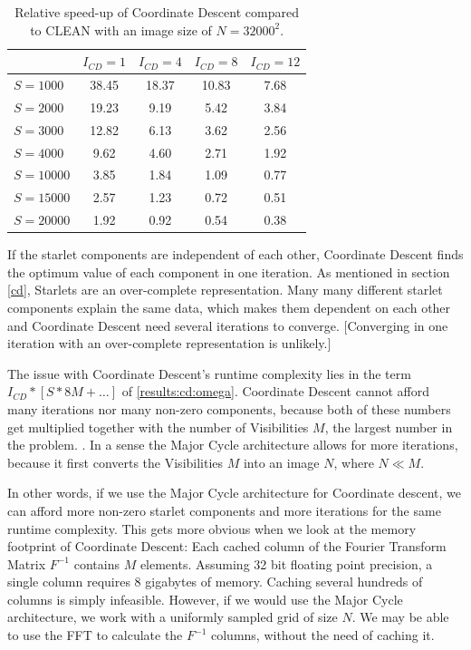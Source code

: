 \begin{table}[h!]
	\begin{center}
		\begin{tabular}{l|c|c|c|c} %
			& $I_{CD} = 1$ & $I_{CD} = 4$ &  $I_{CD} = 8$ &  $I_{CD} = 12$\\
			\hline
			$S=1000$ & 38.45 & 18.37 & 10.83 & 7.68\\
			$S=2000$ & 19.23 & 9.19 & 5.42 & 3.84 \\
			$S=3000$ & 12.82 & 6.13 & 3.62 & 2.56 \\
			$S=4000$ & 9.62 & 4.60 & 2.71 & 1.92\\
			\hline
			$S=10000$ & 3.85 & 1.84 & 1.09 & 0.77 \\
			$S=15000$ & 2.57 & 1.23 & 0.72 & 0.51\\
			$S=20000$ & 1.92 & 0.92 & 0.54 & 0.38 \\
		\end{tabular}
		\caption{Relative speed-up of Coordinate Descent compared to CLEAN with an image size of $N=32000^2$. }
		\label{res:cd:large:table}
	\end{center}
\end{table}

If the starlet components are independent of each other, Coordinate Descent finds the optimum value of each component in one iteration. As mentioned in section \ref{cd}, Starlets are an over-complete representation. Many many different starlet components explain the same data, which makes them dependent on each other and Coordinate Descent need several iterations to converge. [Converging in one iteration with an over-complete representation is unlikely.]

The issue with Coordinate Descent's runtime complexity lies in the term $ I_{CD} * [S * 8M +\ldots]$ of \eqref{results:cd:omega}. Coordinate Descent cannot afford many iterations nor many non-zero components, because both of these numbers get multiplied together with the number of Visibilities $M$, the largest number in the problem. . In a sense the Major Cycle architecture allows for more iterations, because it first converts the Visibilities $M$ into an image $N$, where $N \ll M$.

In other words, if we use the Major Cycle architecture for Coordinate descent, we can afford more non-zero starlet components and more iterations for the same runtime complexity. This gets more obvious when we look at the memory footprint of Coordinate Descent: Each cached column of the Fourier Transform Matrix $F^{-1}$ contains $M$ elements. Assuming 32 bit floating point precision, a single column requires 8 gigabytes of memory. Caching several hundreds of columns is simply infeasible. However, if we would use the Major Cycle architecture, we work with a uniformly sampled grid of size $N$. We may be able to use the FFT to calculate the $F^{-1}$ columns, without the need of caching it.

